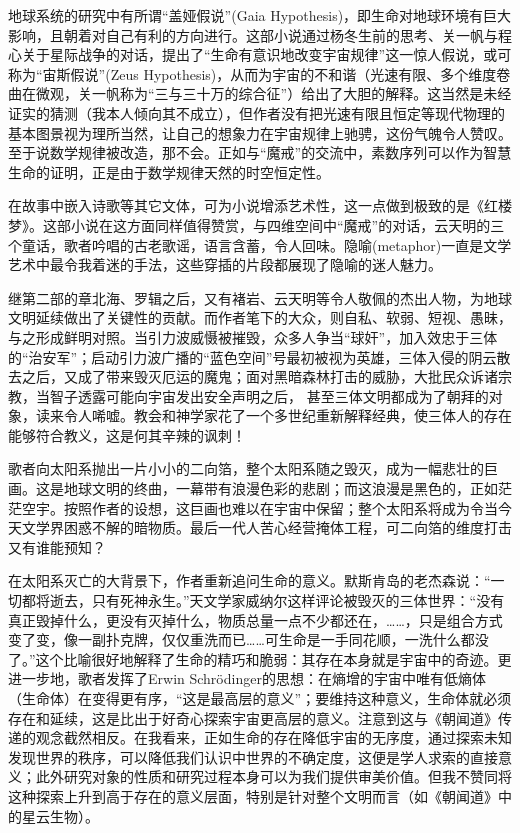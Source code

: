 \par 地球系统的研究中有所谓“盖娅假说”(Gaia Hypothesis)，即生命对地球环境有巨大影响，且朝着对自己有利的方向进行。这部小说通过杨冬生前的思考、关一帆与程心关于星际战争的对话，提出了“生命有意识地改变宇宙规律”这一惊人假说，或可称为“宙斯假说”(Zeus Hypothesis)，从而为宇宙的不和谐（光速有限、多个维度卷曲在微观，关一帆称为“三与三十万的综合征”）给出了大胆的解释。这当然是未经证实的猜测（我本人倾向其不成立），但作者没有把光速有限且恒定等现代物理的基本图景视为理所当然，让自己的想象力在宇宙规律上驰骋，这份气魄令人赞叹。至于说数学规律被改造，那不会。正如与“魔戒”的交流中，素数序列可以作为智慧生命的证明，正是由于数学规律天然的时空恒定性。
\par 在故事中嵌入诗歌等其它文体，可为小说增添艺术性，这一点做到极致的是《红楼梦》。这部小说在这方面同样值得赞赏，与四维空间中“魔戒”的对话，云天明的三个童话，歌者吟唱的古老歌谣，语言含蓄，令人回味。隐喻(metaphor)一直是文学艺术中最令我着迷的手法，这些穿插的片段都展现了隐喻的迷人魅力。
\par 继第二部的章北海、罗辑之后，又有褚岩、云天明等令人敬佩的杰出人物，为地球文明延续做出了关键性的贡献。而作者笔下的大众，则自私、软弱、短视、愚昧，与之形成鲜明对照。当引力波威慑被摧毁，众多人争当“球奸”，加入效忠于三体的“治安军”；启动引力波广播的“蓝色空间”号最初被视为英雄，三体入侵的阴云散去之后，又成了带来毁灭厄运的魔鬼；面对黑暗森林打击的威胁，大批民众诉诸宗教，当智子透露可能向宇宙发出安全声明之后， 甚至三体文明都成为了朝拜的对象，读来令人唏嘘。教会和神学家花了一个多世纪重新解释经典，使三体人的存在能够符合教义，这是何其辛辣的讽刺！
\par 歌者向太阳系抛出一片小小的二向箔，整个太阳系随之毁灭，成为一幅悲壮的巨画。这是地球文明的终曲，一幕带有浪漫色彩的悲剧；而这浪漫是黑色的，正如茫茫空宇。按照作者的设想，这巨画也难以在宇宙中保留；整个太阳系将成为令当今天文学界困惑不解的暗物质。最后一代人苦心经营掩体工程，可二向箔的维度打击又有谁能预知？
\par 在太阳系灭亡的大背景下，作者重新追问生命的意义。默斯肯岛的老杰森说：“一切都将逝去，只有死神永生。”天文学家威纳尔这样评论被毁灭的三体世界：“没有真正毁掉什么，更没有灭掉什么，物质总量一点不少都还在，……，只是组合方式变了变，像一副扑克牌，仅仅重洗而已……可生命是一手同花顺，一洗什么都没了。”这个比喻很好地解释了生命的精巧和脆弱：其存在本身就是宇宙中的奇迹。更进一步地，歌者发挥了Erwin Schrödinger的思想：在熵增的宇宙中唯有低熵体（生命体）在变得更有序，“这是最高层的意义”；要维持这种意义，生命体就必须存在和延续，这是比出于好奇心探索宇宙更高层的意义。注意到这与《朝闻道》传递的观念截然相反。在我看来，正如生命的存在降低宇宙的无序度，通过探索未知发现世界的秩序，可以降低我们认识中世界的不确定度，这便是学人求索的直接意义；此外研究对象的性质和研究过程本身可以为我们提供审美价值。但我不赞同将这种探索上升到高于存在的意义层面，特别是针对整个文明而言（如《朝闻道》中的星云生物）。
